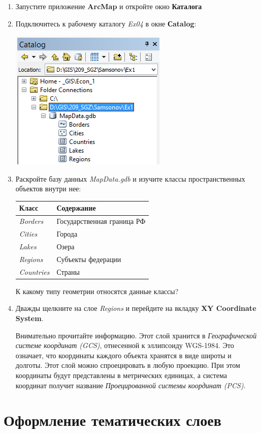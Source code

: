 \documentclass[]{book}
\theoremstyle{definition}
\theoremstyle{definition}
\theoremstyle{definition}
\theoremstyle{remark}
\begin{document}
\begin{enumerate}
\def\labelenumi{\arabic{enumi}.}
\item
  Запустите приложение \textbf{ArcMap} и откройте окно \textbf{Каталога}
\item
  Подключитесь к рабочему каталогу \emph{Ex04} в окне \textbf{Сatalog}:

  \includegraphics{images/Ex04/image2.png}
\item
  Раскройте базу данных \emph{MapData.gdb} и изучите классы
  пространственных объектов внутри нее:

  \begin{longtable}[]{@{}ll@{}}
  \toprule
  \textbf{Класс} & \textbf{Содержание}\tabularnewline
  \midrule
  \endhead
  \emph{Borders} & Государственная граница РФ\tabularnewline
  \emph{Cities} & Города\tabularnewline
  \emph{Lakes} & Озера\tabularnewline
  \emph{Regions} & Субъекты федерации\tabularnewline
  \emph{Countries} & Страны\tabularnewline
  \bottomrule
  \end{longtable}

  К какому типу геометрии относятся данные классы?
\item
  Дважды щелкните на слое \emph{Regions} и перейдите на вкладку
  \textbf{XY Coordinate System}.

  Внимательно прочитайте информацию. Этот слой хранится в
  \emph{Географической системе координат (GCS)}, отнесенной к эллипсоиду
  WGS-1984. Это означает, что координаты каждого объекта хранятся в виде
  широты и долготы. Этот слой можно спроецировать в любую проекцию. При
  этом координаты будут представлены в метрических единицах, а система
  координат получит название \emph{Проецированной системы координат
  (PCS)}.
\end{enumerate}

\hypertarget{map-design-economic-thematic}{%
\section{Оформление тематических
слоев}\label{map-design-economic-thematic}}
\end{document}
